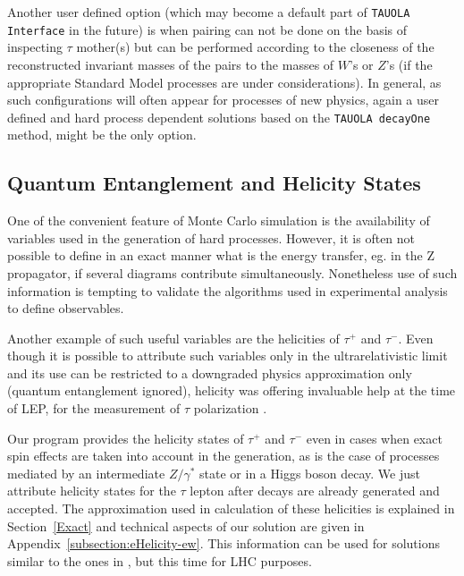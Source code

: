 \documentclass[]{Tauola_interface_design}
\begin{document}
Another user defined option (which may become a default part of {\tt TAUOLA Interface} in the future) is when pairing can not be done on the basis of inspecting $\tau$
mother(s) but
can be performed
 according to the closeness of the reconstructed invariant
masses of the pairs
to the masses of $W$'s or $Z$'s (if the appropriate Standard Model processes are under considerations). In general, as such configurations will often 
appear  for processes of new physics, again a user defined and hard process dependent solutions based on the {\tt TAUOLA decayOne} method,
might be the only option.

\subsection{Quantum Entanglement and Helicity States}



One of the convenient feature of Monte Carlo simulation is the availability of 
variables used in the generation of hard processes. However, it is often not possible to define
in an exact manner what is the energy transfer, eg. in the Z propagator, if several
diagrams contribute simultaneously. Nonetheless use of such
information is tempting  to validate the algorithms used in experimental analysis
to define observables.

Another example of such useful variables  are  the helicities  of  $\tau^+$ and $\tau^-$.
Even though  it is possible to attribute such variables only in the ultrarelativistic limit
and its use can be restricted to a downgraded physics approximation only (quantum entanglement
\cite{Einstin:1935rr} ignored), helicity  was offering invaluable help at the time of LEP,
 for the measurement of $\tau$ polarization \cite{Heister:2001uh}. 

Our program provides the helicity states of $\tau^+$ and $\tau^-$ even in cases 
when exact spin effects are taken into account in the generation, as is the case of processes mediated by 
an intermediate  $Z/\gamma^*$ state or in a Higgs boson decay. 
We just attribute helicity states for the $\tau$ lepton after decays
are already generated and accepted.
The approximation used in calculation of these helicities is explained in Section~\ref{Exact} 
and technical aspects of our solution
are given in Appendix~\ref{subsection:eHelicity-ew}. This information
can be used for solutions similar to the ones in  \cite{Heister:2001uh},
but this time for LHC purposes.
\end{document}
